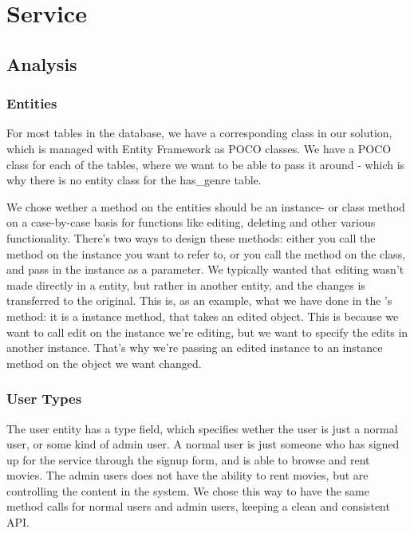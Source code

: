 \section{Service}
\label{Design_Service}

\subsection{Analysis}
\label{Design_Service_Analysis}

\subsubsection{Entities}
\label{Design_Service_Analysis_Entities}
For most tables in the database, we have a corresponding class in our solution, which is managed with Entity Framework as POCO classes. We have a POCO class for each of the tables, where we want to be able to pass it around - which is why there is no entity class for the has_genre table.

We chose wether a method on the entities should be an instance- or class method on a case-by-case basis for functions like editing, deleting and other various functionality. There's two ways to design these methods: either you call the method on the instance you want to refer to, or you call the method on the class, and pass in the instance as a parameter. We typically wanted that editing wasn't made directly in a entity, but rather in another entity, and the changes is transferred to the original. This is, as an example, what we have done in the 's  method: it is a instance method, that takes an edited object. This is because we want to call edit on the instance we're editing, but we want to specify the edits in another instance. That's why we're passing an edited instance to an instance method on the object we want changed.

\subsubsection{User Types}
\label{Design_Service_Analysis_UserTypes}
The user entity has a type field, which specifies wether the user is just a normal user, or some kind of admin user. A normal user is just someone who has signed up for the service through the signup form, and is able to browse and rent movies. The admin users does not have the ability to rent movies, but are controlling the content in the system. We chose this way to have the same method calls for normal users and admin users, keeping a clean and consistent API. 

